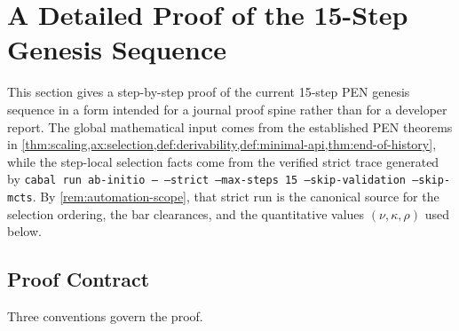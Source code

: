 \documentclass[11pt,a4paper]{article}
\theoremstyle{plain}
\theoremstyle{definition}
\theoremstyle{remark}
\begin{document}
\fi

\section{A Detailed Proof of the 15-Step Genesis Sequence}
\label{sec:genesis-sequence-proof}

This section gives a step-by-step proof of the current 15-step PEN genesis
sequence in a form intended for a journal proof spine rather than for a
developer report.
The global mathematical input comes from the established PEN theorems in
\cref{thm:scaling,ax:selection,def:derivability,def:minimal-api,thm:end-of-history},
while the step-local selection facts come from the verified strict trace
generated by
\texttt{cabal run ab-initio -- --strict --max-steps 15 --skip-validation --skip-mcts}.
By \cref{rem:automation-scope}, that strict run is the canonical source for the
selection ordering, the bar clearances, and the quantitative values
$(\nu,\kappa,\rho)$ used below.

\let\genesissequenceorigparagraph\paragraph
\renewcommand{\paragraph}[1]{\par\medskip\noindent\textbf{#1.}\ }

\subsection{Proof Contract}
\label{subsec:genesis-proof-contract}

Three conventions govern the proof.
\end{document}
